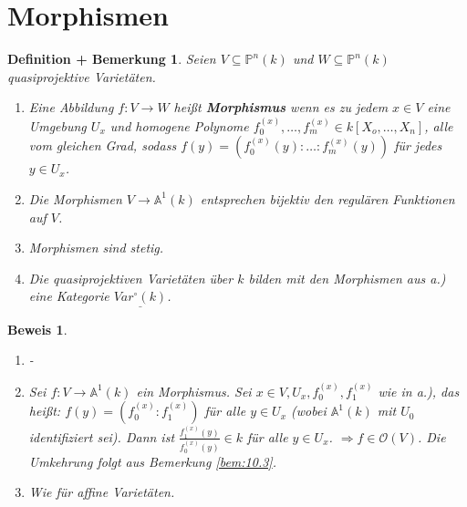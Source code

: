 \documentclass[a4paper,12pt]{report}
\theoremstyle{break}
\newtheorem{DefBem}[Def]{Definition + Bemerkung}
\theoremstyle{nonumberbreak}
\theoremstyle{nonumberplain}
\newtheorem{Bew}{Beweis}
\newcommand{\emp}[1]{\textbf{\emph{#1}}}
\newcommand{\begriff}[1]{{\index{#1}}\emp{#1}}
\begin{document}
\section{Morphismen}
\begin{DefBem}
  \label{defbem:11.1}
  Seien $V\subseteq \mathbb P^n(k)$ und $W\subseteq \mathbb P^n(k)$ quasiprojektive Varietäten.
  \begin{enumerate}
  \item Eine Abbildung $f:V\longrightarrow W$ heißt \begriff{Morphismus} wenn es zu jedem $x\in V$ eine Umgebung $U_x$ und homogene 
    Polynome $f_0^{(x)},\dots,f_m^{(x)}\in k[X_o,\dots,X_n]$, alle vom gleichen Grad, sodass $f(y)=\left(f_0^{(x)}(y):\dots:f_m^{(x)}(y)\right)$
    für jedes $y\in U_x$.
  \item Die Morphismen $V\longrightarrow \mathbb A^1(k)$ entsprechen bijektiv den regulären Funktionen auf $V$.
  \item Morphismen sind stetig.
  \item Die quasiprojektiven Varietäten über $k$ bilden mit den Morphismen aus a.) eine Kategorie $\underline{Var^\circ(k)}$.
  \end{enumerate}
\end{DefBem}
\begin{Bew}
  \begin{enumerate}
  \item -
  \item Sei $f:V\longrightarrow\mathbb A^1(k)$ ein Morphismus. Sei $x\in V, U_x, f_0^{(x)},f_1^{(x)}$ wie in a.), das heißt: 
    $f(y)=\left(f_0^{(x)}:f_1^{(x)}\right)$ für alle $y\in U_x$ (wobei $\mathbb A^1(k)$ mit $U_0$ identifiziert sei).
    Dann ist $\frac{f_1^{(x)}(y)}{f_0^{(x)}(y)}\in k$ für alle $y\in U_x$. $\Rightarrow f\in \mathcal O(V)$. 
    Die Umkehrung folgt aus Bemerkung \ref{bem:10.3}.
  \item Wie für affine Varietäten.
  \end{enumerate}
\end{Bew}
\end{document}
